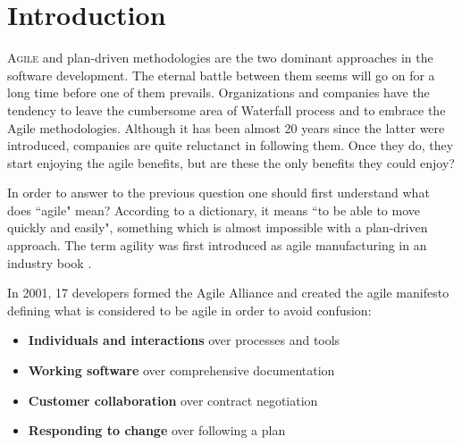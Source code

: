 \chapter{Introduction}

\lettrine[lines=4, loversize=-0.1, lraise=0.1]{A}{gile} and plan-driven methodologies are the two dominant approaches in the software development. The eternal battle between them seems will go on for a long time before  one of them prevails. Organizations and companies have the tendency to leave the cumbersome area of Waterfall process and to embrace the Agile methodologies. Although it has been almost 20 years since the latter were introduced, companies are quite reluctanct in following them. Once they do, they start enjoying the agile benefits, but are these the only benefits they could enjoy? 

In order to answer to the previous question one should first understand what does ``agile" mean? According to a dictionary, it means ``to be able to move quickly and easily", something which is almost impossible with a plan-driven approach. The term agility was first introduced as agile manufacturing in an industry book \cite{agile_manufacturing}.

In 2001, 17 developers formed the Agile Alliance and created the agile manifesto \cite{beck2001agile} defining what is considered to be agile in order to avoid confusion:  
\begin{itemize}
	\item {\large \textbf{Individuals and interactions}} over processes and tools
	\item {\large \textbf{Working software}} over comprehensive documentation
	\item {\large \textbf{Customer collaboration}} over contract negotiation
	\item {\large \textbf{Responding to change}} over following a plan
\end{itemize}

